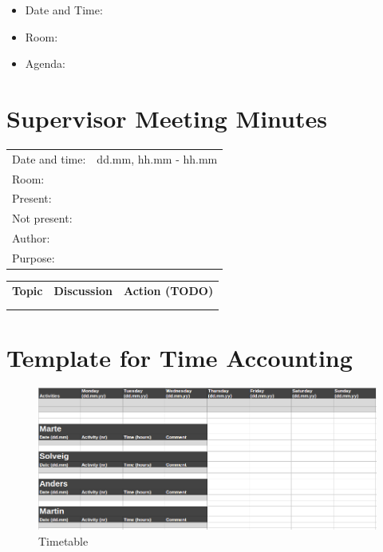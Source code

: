 \begin{itemize}
	\item Date and Time:
	\item Room:
	\item Agenda:
\end{itemize}

\section{Supervisor Meeting Minutes}
\begin{table}[H]
\begin{tabular}{| p{3cm} | p{9cm} |}
	\hline
	\rowcolor{gray}
	\multicolumn{2}{|c|}{\Large \bf Meeting Minutes - Supervisor Meeting} \\ \hline
	Date and time: & dd.mm,  hh.mm - hh.mm \\ \hline
	Room: &  \\ \hline
	Present: &  \\ \hline
	Not present: &  \\ \hline
	Author: &  \\ \hline
	Purpose: &  \\ \hline
\end{tabular}
\end{table}

\begin{table}[H]
\begin{tabular}{| p{} | p{} | p{} |}
	\hline
	\rowcolor{gray}
	\multicolumn{3}{|c|}{\Large \bf Agenda} \\ \hline
	{\bf Topic} & {\bf Discussion} & {\bf Action (TODO)} \\ \hline
	& & \\ \hline
	& & \\ \hline
\end{tabular}
\end{table}

\section{Template for Time Accounting}
\label{sec:timetable}

\begin{figure}[H]
	\includegraphics[width=\textwidth]{pictures/timetable.png}
	\caption{Timetable}
\end{figure}